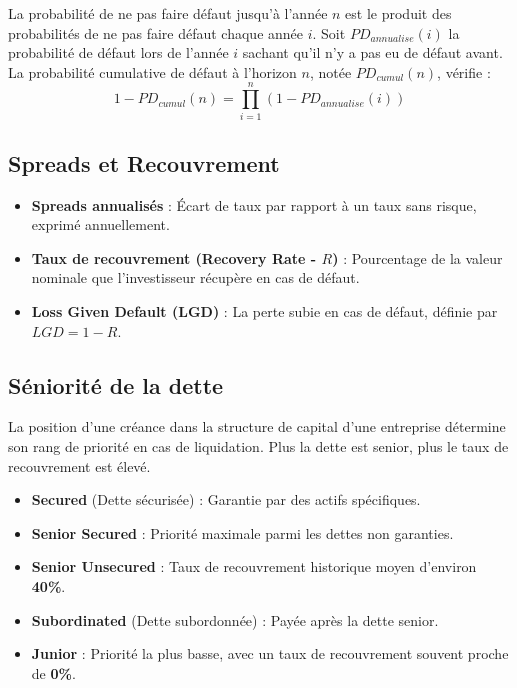 La probabilité de ne pas faire défaut jusqu'à l'année $n$ est le produit des probabilités de ne pas faire défaut chaque année $i$.
Soit $PD_{annualise}(i)$ la probabilité de défaut lors de l'année $i$ sachant qu'il n'y a pas eu de défaut avant.
La probabilité cumulative de défaut à l'horizon $n$, notée $PD_{cumul}(n)$, vérifie :
\begin{equation}
    1 - PD_{cumul}(n) = \prod_{i=1}^n \left( 1 - PD_{annualise}(i) \right)
\end{equation}

\subsection{Spreads et Recouvrement}

\begin{itemize}
    \item \textbf{Spreads annualisés} : Écart de taux par rapport à un taux sans risque, exprimé annuellement.
    \item \textbf{Taux de recouvrement (Recovery Rate - $R$)} : Pourcentage de la valeur nominale que l'investisseur récupère en cas de défaut.
    \item \textbf{Loss Given Default (LGD)} : La perte subie en cas de défaut, définie par $LGD = 1 - R$.
\end{itemize}

\subsection{Séniorité de la dette}

La position d'une créance dans la structure de capital d'une entreprise détermine son rang de priorité en cas de liquidation. Plus la dette est senior, plus le taux de recouvrement est élevé.

\begin{itemize}
    \item \textbf{Secured} (Dette sécurisée) : Garantie par des actifs spécifiques.
    \item \textbf{Senior Secured} : Priorité maximale parmi les dettes non garanties.
    \item \textbf{Senior Unsecured} : Taux de recouvrement historique moyen d'environ \textbf{40\%}.
    \item \textbf{Subordinated} (Dette subordonnée) : Payée après la dette senior.
    \item \textbf{Junior} : Priorité la plus basse, avec un taux de recouvrement souvent proche de \textbf{0\%}.
\end{itemize}

